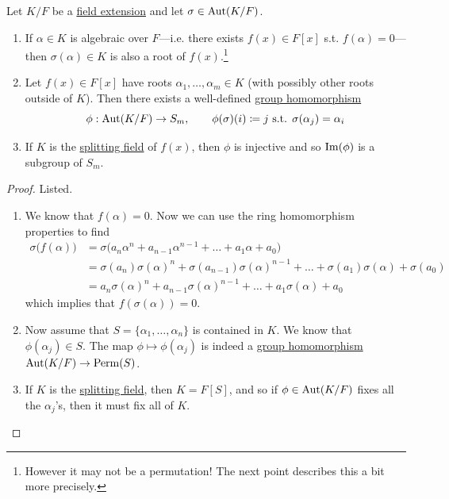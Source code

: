   \begin{lemma}
    \label{thm:f_auto_permute}
    Let $K/F$ be a \hyperref[def:field-extension]{field extension} and let $\sigma \in \operatorname{Aut}(K/F)$. 
    \begin{enumerate}
      \item If $\alpha \in K$ is algebraic over $F$---i.e. there exists $f(x) \in F[x]$ s.t. $f(\alpha) = 0$---then $\sigma (\alpha) \in K$ is also a root of $f(x)$.\footnote{However it may not be a permutation! The next point describes this a bit more precisely.}

      \item Let $f(x) \in F[x]$ have roots $\alpha_1, \ldots, \alpha_m \in K$ (with possibly other roots outside of $K$). Then there exists a well-defined \hyperref[def:group-homomorphism]{group homomorphism} 
      \begin{equation}
        \phi: \operatorname{Aut}(K/F) \to S_m, \qquad \phi(\sigma)(i) \coloneqq j \text{ s.t. } \sigma(\alpha_j) = \alpha_i
      \end{equation}

      \item If $K$ is the \hyperref[def:splitting-field]{splitting field} of $f(x)$, then $\phi$ is injective and so $\operatorname{Im}(\phi)$ is a subgroup of $S_m$. 
    \end{enumerate}
  \end{lemma}
  \begin{proof}
    Listed. 
    \begin{enumerate}
      \item We know that $f(\alpha) = 0$. Now we can use the ring homomorphism properties to find
      \begin{align}
        \sigma\big( f(\alpha) \big) & = \sigma \big( a_n \alpha^n + a_{n-1} \alpha^{n-1} + \ldots + a_1 \alpha + a_0 \big) \\  
                                    & = \sigma(a_n) \sigma(\alpha)^n + \sigma(a_{n-1}) \sigma(\alpha)^{n-1} + \ldots + \sigma(a_1) \sigma(\alpha) + \sigma(a_0) \\ 
                                    & = a_n \sigma(\alpha)^n + a_{n-1} \sigma(\alpha)^{n-1} + \ldots + a_1 \sigma(\alpha) + a_0
      \end{align}
      which implies that $f(\sigma(\alpha)) = 0$. 

      \item Now assume that $S = \{\alpha_1, \ldots, \alpha_n\}$ is contained in $K$. We know that $\phi(\alpha_j) \in S$. The map $\phi \mapsto \phi(\alpha_j)$ is indeed a \hyperref[def:group-homomorphism]{group homomorphism} $\operatorname{Aut}(K/F) \to \mathrm{Perm}(S)$. 

      \item If $K$ is the \hyperref[def:splitting-field]{splitting field}, then $K = F[S]$, and so if $\phi \in \operatorname{Aut}(K/F)$ fixes all the $\alpha_j$'s, then it must fix all of $K$. 
    \end{enumerate}
  \end{proof} 

